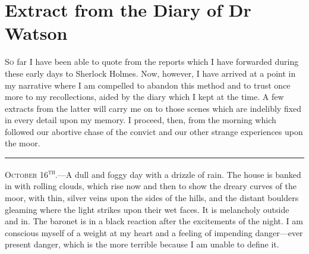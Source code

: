 \chapter{Extract from the Diary of Dr Watson}
\lettrine[lines=1]{S}{o} far I have been able to quote from the reports which I have forwarded during these early days to Sherlock Holmes. Now, however, I have arrived at a point in my narrative where I am compelled to abandon this method and to trust once more to my recollections, aided by the diary which I kept at the time. A few extracts from the latter will carry me on to those scenes which are indelibly fixed in every detail upon my memory. I proceed, then, from the morning which followed our abortive chase of the convict and our other strange experiences upon the moor.
\vfill

\noindent\hfil\rule{0.5\textwidth}{.4pt}\hfil 

\textsc{October 16\textsuperscript{th}.}—A dull and foggy day with a drizzle of rain. The house is banked in with rolling clouds, which rise now and then to show the dreary curves of the moor, with thin, silver veins upon the sides of the hills, and the distant boulders gleaming where the light strikes upon their wet faces. It is melancholy outside and in. The baronet is in a black reaction after the excitements of the night. I am conscious myself of a weight at my heart and a feeling of impending danger—ever present danger, which is the more terrible because I am unable to define it.

